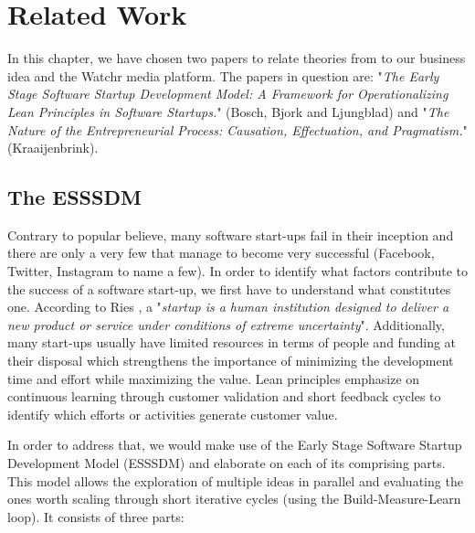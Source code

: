 \section{Related Work}
\label{sec:related_work}

In this chapter, we have chosen two papers to relate theories from to our business idea and the Watchr media platform. The papers in question are: "\textit{The Early Stage Software Startup Development Model: A Framework for Operationalizing Lean Principles in Software Startups.}" (Bosch, Bjork and Ljungblad) and "\textit{The Nature of the Entrepreneurial Process: Causation, Effectuation, and Pragmatism.}"(Kraaijenbrink). 

\subsection{The ESSSDM}

Contrary to popular believe, many software start-ups fail in their inception and there are only a very few that manage to become very successful (Facebook, Twitter, Instagram to name a few). In order to identify what factors contribute to the success of a software start-up, we first have to understand what constitutes one. According to Ries , a "\textit{startup is a human institution designed to deliver a new product or service under conditions of extreme uncertainty}". Additionally, many start-ups usually have limited resources in terms of people and funding at their disposal which strengthens the importance of minimizing the development time and effort while maximizing the value. Lean principles emphasize on continuous learning through customer validation and short feedback cycles to identify which efforts or activities generate customer value.


In order to address that, we would make use of the Early Stage Software Startup Development Model (ESSSDM) and elaborate on each of its comprising parts. This model allows the exploration of multiple ideas in parallel and evaluating the ones worth scaling through short iterative cycles (using the Build-Measure-Learn loop). It consists of three parts: 
  
